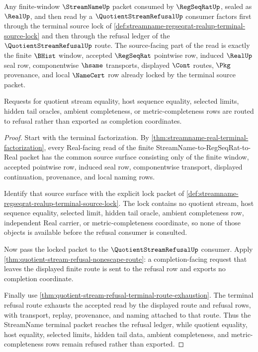 \begin{theorem}
\label{thm:streamname-real-terminal-quotient-refusal}
Any finite-window $\StreamNameUp$ packet consumed by $\RegSeqRatUp$, sealed as $\RealUp$, and then read by a $\QuotientStreamRefusalUp$ consumer factors first through the terminal source lock of \autoref{def:streamname-regseqrat-realup-terminal-source-lock} and then through the refusal ledger of the $\QuotientStreamRefusalUp$ route. The source-facing part of the read is exactly the finite $\BHist$ window, accepted $\RegSeqRat$ pointwise row, induced $\RealUp$ seal row, componentwise $\hsame$ transports, displayed $\Cont$ routes, $\Pkg$ provenance, and local $\NameCert$ row already locked by the terminal source packet.

Requests for quotient stream equality, host sequence equality, selected limits, hidden tail oracles, ambient completeness, or metric-completeness rows are routed to refusal rather than exported as completion coordinates.
\end{theorem}
\begin{proof}
Start with the terminal factorization. By \autoref{thm:streamname-real-terminal-factorization}, every Real-facing read of the finite StreamName-to-RegSeqRat-to-Real packet has the common source surface consisting only of the finite window, accepted pointwise row, induced seal row, componentwise transport, displayed continuation, provenance, and local naming rows.

Identify that source surface with the explicit lock packet of \autoref{def:streamname-regseqrat-realup-terminal-source-lock}. The lock contains no quotient stream, host sequence equality, selected limit, hidden tail oracle, ambient completeness row, independent Real carrier, or metric-completeness coordinate, so none of those objects is available before the refusal consumer is consulted.

Now pass the locked packet to the $\QuotientStreamRefusalUp$ consumer. Apply \autoref{thm:quotient-stream-refusal-nonescape-route}: a completion-facing request that leaves the displayed finite route is sent to the refusal row and exports no completion coordinate.

Finally use \autoref{thm:quotient-stream-refusal-terminal-route-exhaustion}. The terminal refusal route exhausts the accepted read by the displayed route and refusal rows, with transport, replay, provenance, and naming attached to that route. Thus the StreamName terminal packet reaches the refusal ledger, while quotient equality, host equality, selected limits, hidden tail data, ambient completeness, and metric-completeness rows remain refused rather than exported.
\end{proof}
